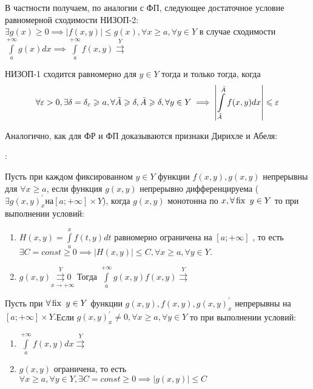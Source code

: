 \documentclass[../../main.tex]{subfiles}
\begin{document}
В частности получаем, по аналогии с ФП, следующее достаточное условие 
равномерной сходимости НИЗОП-2:
$\exists g(x) \ge 0 \implies \left| f(x,y) \right| \le g(x), \forall x \ge a, 
\forall y \in Y $ в случае сходимости $\int\limits_a^{+\infty}g(x)dx \implies 
\int\limits_a^{+\infty}f(x,y) \overset{Y}\rightrightarrows $

\begin{crl*}
НИЗОП-1 сходится равномерно для $ y \in Y$ тогда и только тогда, 
когда\begin{equation}\label{lec10:11} \forall \varepsilon > 0, \exists \delta = 
\delta_\varepsilon \geqslant a, \forall \tilde{A} \geqslant \delta, \bar{A} \geqslant \delta, \forall y 
\in Y \implies \left| \int\limits_{\tilde{A}}^{\bar{A}}f(x,y)dx \right| \leqslant 
\varepsilon \end{equation}
\end{crl*}

Аналогично, как для ФР и ФП доказываются признаки Дирихле и Абеля:

\begin{thm}
:

Пусть при каждом фиксированном $y \in Y$ функции $f(x,y),g(x,y)$ непрерывны 
для $\forall x \ge a$, если функция $g(x,y)$ непрерывно дифференцируема 
($\exists g(x,y)_x^\prime на [a;+\infty] \times Y $), когда $g(x,y)$ 
монотонна по $x, \forall \operatorname{fix} \ y \in Y$ то при выполнении условий:

\begin{enumerate}
\item $H(x,y) = \int\limits_a^x f(t,y)dt$ равномерно ограничена на $[a;+\infty]$ 
, то  есть $\exists C = const \ge 0 \implies \left|H(x,y)\right| \le C, 
\forall x \ge a, \forall y \in Y.$
\item $g(x,y)\underset{x \to +\infty}{\overset{Y}{\rightrightarrows} 0}$
Тогда $\int\limits_a^{+\infty} g(x,y)f(x,y) \overset{Y}{\rightrightarrows}$
\end{enumerate}
\end{thm}

\begin{thm}

Пусть при $\forall \operatorname{fix} \ y \in Y $ функции $g(x,y), f(x,y), g(x,y)_x^\prime$ 
непрерывны на $[a;+\infty]\times Y.$Если $ g(x,y)_x^\prime \not = 0, \forall x 
\ge a, \forall y \in Y $ то при выполнении условий:

\begin{enumerate}
\item $\int\limits_a^{+\infty}f(x,y)dx \overset{Y}{\rightrightarrows}$

\item $g(x,y)$ ограничена, то есть $\forall x \ge a, \forall y \in Y, \exists C = 
const \ge 0 \implies \left|g(x,y)\right| \le C $
\end{enumerate}
\end{thm}
\end{document}
